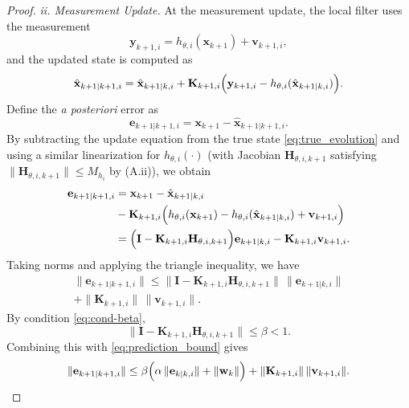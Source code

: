 \documentclass[letterpaper, 10 pt, conference]{ieeeconf}
\begin{document}
\begin{proof}
\noindent\textit{ii. Measurement Update.}  
At the measurement update, the local filter uses the measurement
\begin{equation}
    \mathbf{y}_{k+1,i} = h_{\theta,i}(\mathbf{x}_{k+1}) + \mathbf{v}_{k+1,i},
    \label{eq:measurement_model_proof}
\end{equation}
and the updated state is computed as
\begin{equation}
    \hat{\mathbf{x}}_{k+1|k+1,i} = \hat{\mathbf{x}}_{k+1|k,i} + \mathbf{K}_{k+1,i} \Bigl( \mathbf{y}_{k+1,i} - h_{\theta,i}(\hat{\mathbf{x}}_{k+1|k,i}) \Bigr).
\end{equation}
Define the \emph{a posteriori} error as
\begin{equation}
    \mathbf{e}_{k+1|k+1,i} = \mathbf{x}_{k+1} - \hat{\mathbf{x}}_{k+1|k+1,i}.
\end{equation}
By subtracting the update equation from the true state \eqref{eq:true_evolution} and using a similar linearization for $h_{\theta,i}(\cdot)$ (with Jacobian $\mathbf{H}_{\theta,i,k+1}$ satisfying $\|\mathbf{H}_{\theta,i,k+1}\|\leq M_{h_i}$ by (A.ii)), we obtain
\begin{align}
    \mathbf{e}_{k+1|k+1,i} &= \mathbf{x}_{k+1} - \hat{\mathbf{x}}_{k+1|k,i} \nonumber \\
    &- \mathbf{K}_{k+1,i} \Bigl( h_{\theta,i}(\mathbf{x}_{k+1}) - h_{\theta,i}(\hat{\mathbf{x}}_{k+1|k,i}) + \mathbf{v}_{k+1,i}\Bigr) \nonumber \\
    &= \Bigl( \mathbf{I} - \mathbf{K}_{k+1,i}\mathbf{H}_{\theta,i,k+1} \Bigr) \mathbf{e}_{k+1|k,i} - \mathbf{K}_{k+1,i}\mathbf{v}_{k+1,i}.
    \label{eq:post_update_error}
\end{align}
Taking norms and applying the triangle inequality, we have
\begin{multline}
    \|\mathbf{e}_{k+1|k+1,i}\| \leq
    \|\mathbf{I} - \mathbf{K}_{k+1,i}\mathbf{H}_{\theta,i,k+1}\|\,\|\mathbf{e}_{k+1|k,i}\| \\ + \|\mathbf{K}_{k+1,i}\|\,\|\mathbf{v}_{k+1,i}\|.
    \label{eq:measurement_bound}
\end{multline}
By condition \eqref{eq:cond-beta}, 
\begin{equation}
    \|\mathbf{I} - \mathbf{K}_{k+1,i}\mathbf{H}_{\theta,i,k+1}\| \leq \beta < 1.
\end{equation}
Combining this with \eqref{eq:prediction_bound} gives
\begin{equation}
    \|\mathbf{e}_{k+1|k+1,i}\| \leq \beta \Bigl( \alpha\, \|\mathbf{e}_{k|k,i}\| + \|\mathbf{w}_k\| \Bigr) + \|\mathbf{K}_{k+1,i}\|\,\|\mathbf{v}_{k+1,i}\|.

\end{equation}
\end{proof}
\end{document}
